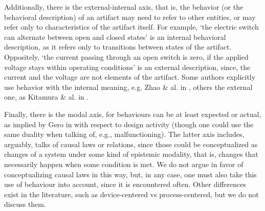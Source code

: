 \documentclass[sw]{iosart2x}
\newcommand{\TODO}[1]{{\color{red} #1}}
\begin{document}
Additionally, there is the external-internal axis, that is, the behavior (or the behavioral description) of an artifact may need to refer to other entities, or may refer only to characteristics of the artifact itself.
For example, `the electric switch can alternate between open and closed states' is an internal behavioral description, as it refers only to transitions between states of the artifact.
Oppositely, `the current passing through an open switch is zero, if the applied voltage stays within operating conditions' is an external description, since, the current and the voltage are not elements of the artifact. %
Some authors explicitly use behavior with the internal meaning, e.g. Zhao \& al. in \cite{zhaoStateBehaviorFunction2019}, others the external one, as Kitamura \& al. in \cite{kitamuraOntologybasedSystematizationFunctional2004}.

Finally, there is the modal axis, for behaviours can be at least expected or actual, as implied by Gero in \cite{geroSituatedFunctionBehaviour2004} with respect to design activity (though one could use the same duality when talking of, e.g., malfunctioning).
The latter axis includes, arguably, talks of causal laws or relations, since those could be conceptualized as changes of a system under some kind of epistemic modality, that is, changes that necessarily happen when some condition is met.
We do not argue in favor of conceptualizing causal laws in this way, but, in any case, one must also take this use of behaviour into account, since it is encountered often.
Other differences exist in the literature, such as device-centered vs process-centered, but we do not discuss them. 
\end{document}
